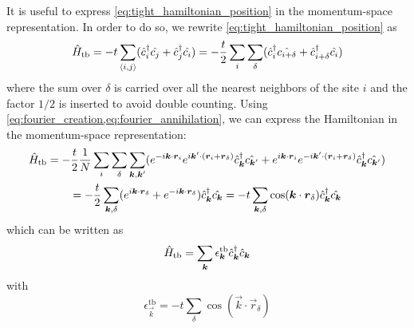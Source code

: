 It is useful to express \cref{eq:tight_hamiltonian_position} in the momentum-space representation. In order to do so, we rewrite \cref{eq:tight_hamiltonian_position} as
\begin{equation}
    \hat{H}_\text{tb} = -t \sum_{\langle i,j \rangle} (\hat{c}^\dagger_i\hat{c_j} +  \hat{c}^\dagger_j\hat{c_i})
    = -\frac{t}{2} \sum_{i} \sum_\delta (\hat{c}^\dagger_i\hat{c_{i+\delta}} +  \hat{c}^\dagger_{i+\delta}\hat{c_i})
\end{equation}
where the sum over $\delta$ is carried over all the nearest neighbors of the site $i$ and the factor $1/2$ is inserted to avoid double counting. Using \cref{eq:fourier_creation,eq:fourier_annihilation}, we can express the Hamiltonian in the momentum-space representation:
\begin{multline}
    \hat{H}_\text{tb}
    = -\frac{t}{2} \frac{1}{N} \sum_{i} \sum_\delta \sum_{\mathbf{\boldsymbol{k}}, \mathbf{\boldsymbol{k}}'}
    (e^{-i\mathbf{\boldsymbol{k}}\cdot\mathbf{\boldsymbol{r}}_i} e^{i\mathbf{\boldsymbol{k}}'\cdot(\mathbf{\boldsymbol{r}}_i+\mathbf{\boldsymbol{r}}_\delta)} \hat{c}^\dagger_{\mathbf{\boldsymbol{k}}} \hat{c_{\mathbf{\boldsymbol{k}}'}} +
    e^{i\mathbf{\boldsymbol{k}}\cdot\mathbf{\boldsymbol{r}}_i} e^{-i\mathbf{\boldsymbol{k}}'\cdot(\mathbf{\boldsymbol{r}}_i+\mathbf{\boldsymbol{r}}_\delta)} \hat{c}^\dagger_{\mathbf{\boldsymbol{k}}} \hat{c_{\mathbf{\boldsymbol{k}}'}}) \\
    = -\frac{t}{2} \sum_{\mathbf{\boldsymbol{k}},\delta} (e^{i\mathbf{\boldsymbol{k}}\cdot\mathbf{\boldsymbol{r}}_\delta}+e^{-i\mathbf{\boldsymbol{k}}\cdot\mathbf{\boldsymbol{r}}_\delta})  \hat{c}^\dagger_{\mathbf{\boldsymbol{k}}} \hat{c_{\mathbf{\boldsymbol{k}}}}
    = -t \sum_{\mathbf{\boldsymbol{k}},\delta} \cos(\mathbf{\boldsymbol{k}}\cdot\mathbf{\boldsymbol{r}}_\delta) \hat{c}^\dagger_{\mathbf{\boldsymbol{k}}} \hat{c_{\mathbf{\boldsymbol{k}}}}
\end{multline}
which can be written as
\begin{equation} \label{eq:tight_hamiltonian_momentum}
    \hat{H}_\text{tb} = \sum_{\mathbf{\boldsymbol{k}}} \epsilon_{\mathbf{\boldsymbol{k}}}^\text{tb} \hat{c}^\dagger_{\mathbf{\boldsymbol{k}}}\hat{c}_{\mathbf{\boldsymbol{k}}}
\end{equation}
with
\begin{equation}
    \epsilon_\vec{k}^\text{tb} = -t \sum_{    \delta} \cos(\vec{k}\cdot\vec{r}_\delta)
\end{equation}


